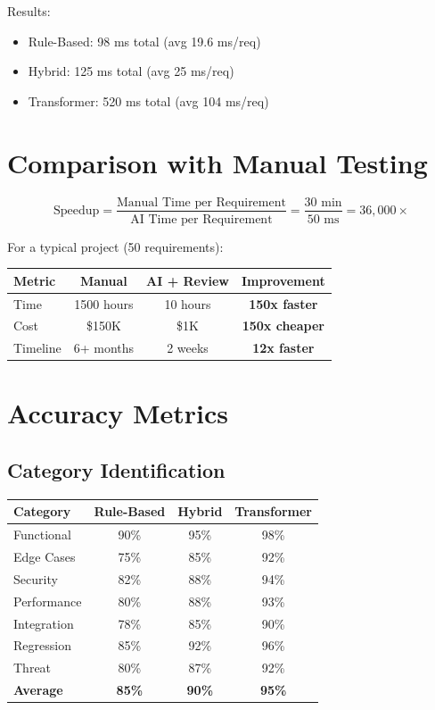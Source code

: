 \documentclass[12pt,oneside]{report}
\begin{document}
Results:
\begin{itemize}
    \item Rule-Based: 98 ms total (avg 19.6 ms/req)
    \item Hybrid: 125 ms total (avg 25 ms/req)
    \item Transformer: 520 ms total (avg 104 ms/req)
\end{itemize}

\section{Comparison with Manual Testing}

\begin{equation}
\text{Speedup} = \frac{\text{Manual Time per Requirement}}{\text{AI Time per Requirement}} = \frac{30 \text{ min}}{50 \text{ ms}} = 36,000\times
\end{equation}

For a typical project (50 requirements):

\begin{table}[H]
\centering
\begin{tabular}{|l|c|c|c|}
\hline
\textbf{Metric} & \textbf{Manual} & \textbf{AI + Review} & \textbf{Improvement} \\
\hline
Time & 1500 hours & 10 hours & \textbf{150x faster} \\
Cost & \$150K & \$1K & \textbf{150x cheaper} \\
Timeline & 6+ months & 2 weeks & \textbf{12x faster} \\
\hline
\end{tabular}
\end{table}

\section{Accuracy Metrics}

\subsection{Category Identification}

\begin{table}[H]
\centering
\begin{tabular}{|l|c|c|c|}
\hline
\textbf{Category} & \textbf{Rule-Based} & \textbf{Hybrid} & \textbf{Transformer} \\
\hline
Functional & 90\% & 95\% & 98\% \\
Edge Cases & 75\% & 85\% & 92\% \\
Security & 82\% & 88\% & 94\% \\
Performance & 80\% & 88\% & 93\% \\
Integration & 78\% & 85\% & 90\% \\
Regression & 85\% & 92\% & 96\% \\
Threat & 80\% & 87\% & 92\% \\
\hline
\textbf{Average} & \textbf{85\%} & \textbf{90\%} & \textbf{95\%} \\
\hline
\end{tabular}
\end{table}
\end{document}
